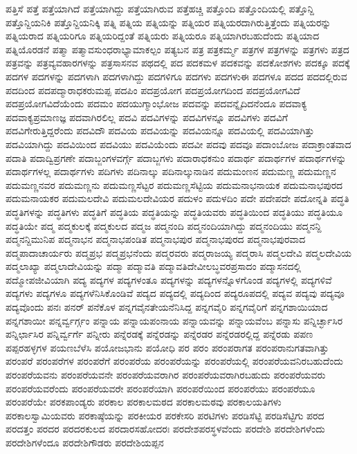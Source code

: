 {ಪತ್ತಿಸೆ
ಪತ್ತೆ
ಪತ್ತೆಯಾಗಿದೆ
ಪತ್ತೆಯಾಗಿದ್ದು
ಪತ್ತೆಯಾಗಿರುವ
ಪತ್ತೆಹಚ್ಚಿ
ಪತ್ತೊಂದಿ
ಪತ್ತೊಂದಿಯಲ್ಲಿ
ಪತ್ತೊನ್ದಿ
ಪತ್ತೊನ್ದಿಯನಿಕಿ
ಪತ್ತೊನ್ದಿಯನಿಕ್ಕಿ
ಪತ್ನಿ
ಪತ್ನಿಯ
ಪತ್ನಿಯನ್ನು
ಪತ್ನಿಯರ
ಪತ್ನಿಯರದಾಗಿರುತ್ತಿತ್ತೆಂದು
ಪತ್ನಿಯರನ್ನು
ಪತ್ನಿಯರಾದ
ಪತ್ನಿಯರಿಗೂ
ಪತ್ನಿಯರಿದ್ದಂತೆ
ಪತ್ನಿಯರು
ಪತ್ನಿಯರೂ
ಪತ್ನಿಯಾಗಿರಬಹುದೆಂದು
ಪತ್ನಿಯಾದ
ಪತ್ನಿಯೊರಡನೆ
ಪತ್ಮಾ
ಪತ್ಮಾವಸುಂಧರಾಭ್ಯಾಮಾಕಲ್ಪಂ
ಪತ್ಯಬನ
ಪತ್ರ
ಪತ್ರಕರ್ಮ್ಮ
ಪತ್ರಗಳ
ಪತ್ರಗಳನ್ನು
ಪತ್ರಗಳು
ಪತ್ರದ
ಪತ್ರವನ್ನು
ಪತ್ರವ್ಯವಹಾರಗಳನ್ನು
ಪತ್ರಸಾಸನವ
ಪಥದಲ್ಲಿ
ಪದ
ಪದಕಮಳ
ಪದಕವನ್ನು
ಪದಕೋಶಗಳು
ಪದಕ್ಕೂ
ಪದಕ್ಕೆ
ಪದಗಳ
ಪದಗಳನ್ನು
ಪದಗಳಾಗಿ
ಪದಗಳಾಗಿದ್ದು
ಪದಗಳಿಗೂ
ಪದಗಳು
ಪದಗಳುಈ
ಪದಗಳೂ
ಪದದ
ಪದದಲ್ಲಿರುವ
ಪದದಿಂದ
ಪದಪದ್ಮಾರಾಧಕರುಮಪ್ಪ
ಪದಪಿಂ
ಪದಪ್ರಯೋಗ
ಪದಪ್ರಯೋಗದಿಂದ
ಪದಪ್ರಯೋಗವಿದೆ
ಪದಪ್ರಯೋಗವಿದೆಯೆಂದು
ಪದಮಂ
ಪದಯುಗ್ಮಾಂಭೋಜ
ಪದವನ್ನು
ಪದವನ್ನೈದಿದನೆಂದೂ
ಪದವಾಕ್ಯ
ಪದವಾಕ್ಯಪ್ರಮಾಣಜ್ಞ
ಪದವಾಗಿರಲಿಲ್ಲ
ಪದವಿ
ಪದವಿಗಳನ್ನು
ಪದವಿಗಳನ್ನೂ
ಪದವಿಗಳು
ಪದವಿಗೆ
ಪದವಿಗೇರುತ್ತಿದ್ದರೆಂದು
ಪದವಿದೌ
ಪದವಿಯ
ಪದವಿಯನ್ನು
ಪದವಿಯನ್ನೂ
ಪದವಿಯಲ್ಲಿ
ಪದವಿಯಾಗಿತ್ತು
ಪದವಿಯಾಗಿದ್ದು
ಪದವಿಯಿಂದ
ಪದವಿಯು
ಪದವಿಯೆಂದು
ಪದವೀ
ಪದವು
ಪದವೂ
ಪದಾಂಬೋಜ
ಪದಾಕ್ರಾಂತವಾದ
ಪದಾತಿ
ಪದಾದ್ವಿಪ್ರಗಣೇ
ಪದಾಬ್ಜಂಗಳವರ್ಗ್ಗೆ
ಪದಾಬ್ಜಗಳು
ಪದಾರಾಧಕನುಂ
ಪದಾರ್ಥ
ಪದಾರ್ಥಗಳ
ಪದಾರ್ಥಗಳನ್ನು
ಪದಾರ್ಥಗಳಲ್ಲ
ಪದಾರ್ಥಗಳು
ಪದಿಗಳು
ಪದಿನಾಲ್ಕು
ಪದಿನಾಲ್ಕುನಾಡಿನ
ಪದುಮಂಣನ
ಪದುಮಣ್ಣ
ಪದುಮಣ್ಣನ
ಪದುಮಣ್ಣನವರ
ಪದುಮಣ್ಣನು
ಪದುಮಣ್ಣಸೆಟ್ಟರ
ಪದುಮಣ್ಣಸೆಟ್ಟಿಯ
ಪದುಮನಾಭನಾಯಕ
ಪದುಮನಾಭಪುರದ
ಪದುಮನಾಯಕರ
ಪದುಮಲದೇವಿ
ಪದುಮಲದೇವಿಯರ
ಪದುಳಂ
ಪದುಳದಿಂ
ಪದೇ
ಪದೇಪದೇ
ಪದೋನ್ನತಿ
ಪದ್ಧತಿ
ಪದ್ಧತಿಗಳನ್ನು
ಪದ್ಧತಿಗಳು
ಪದ್ಧತಿಗೆ
ಪದ್ಧತಿಯ
ಪದ್ಧತಿಯನ್ನು
ಪದ್ಧತಿಯವರು
ಪದ್ಧತಿಯಿಂದ
ಪದ್ಧತಿಯು
ಪದ್ಧತಿಯೂ
ಪದ್ಧತಿಯೇ
ಪದ್ಮ
ಪದ್ಮಕುಲಕ್ಕೆ
ಪದ್ಮಕುಲದ
ಪದ್ಮಜ
ಪದ್ಮನಂದಿ
ಪದ್ಮನಂದಿಯಾಗಿದ್ದು
ಪದ್ಮನಂದಿಯು
ಪದ್ಮನನ್ದಿ
ಪದ್ಮನನ್ದಿಮುನಿಪ
ಪದ್ಮನಾಭನ
ಪದ್ಮನಾಭಪಂಡಿತ
ಪದ್ಮನಾಭಪುರ
ಪದ್ಮನಾಭಪುರದ
ಪದ್ಮನಾಭಪುರವಾದ
ಪದ್ಮಪಾದಾಚಾರ್ಯರು
ಪದ್ಮಪ್ರಭ
ಪದ್ಮಪ್ರಭನೆಂದು
ಪದ್ಮರವರು
ಪದ್ಮರಾಜಯ್ಯ
ಪದ್ಮರಾಸಿ
ಪದ್ಮಲದೇವಿ
ಪದ್ಮಲದೇವಿಯ
ಪದ್ಮಲಾಖ್ಯಾ
ಪದ್ಮಲಾದೇವಿಯನ್ನು
ಪದ್ಮಾ
ಪದ್ಮಾವತಿ
ಪದ್ಮಾವತಿದೇವೀಲಬ್ಧವರಪ್ರಸಾದಂ
ಪದ್ಮಾಸನದಲ್ಲಿ
ಪದ್ಮೋಪಜೀವಿಯಾಗಿ
ಪದ್ಯ
ಪದ್ಯಗಳ
ಪದ್ಯಗಳಂತೂ
ಪದ್ಯಗಳನ್ನು
ಪದ್ಯಗಳನ್ನೊಳಗೊಂಡ
ಪದ್ಯಗಳಲ್ಲಿ
ಪದ್ಯಗಳಿವೆ
ಪದ್ಯಗಳು
ಪದ್ಯಗಳೂ
ಪದ್ಯಗಳೆನಿಸಿಕೊಂಡಿವೆ
ಪದ್ಯದ
ಪದ್ಯದಲ್ಲಿ
ಪದ್ಯದಿಂದ
ಪದ್ಯರೂಪದಲ್ಲಿ
ಪದ್ಯವ
ಪದ್ಯವು
ಪದ್ಯವೂ
ಪದ್ಯವೊಂದು
ಪನಃ
ಪನರ್
ಪನೆಕೊಳ
ಪನ್ನಗವೈನತೇಯನೆನಿಸಿದ್ದ
ಪನ್ನಗವೈರಿ
ಪನ್ನಗವೈರಿಗೆ
ಪನ್ನಗಶಾಯಿಯಾದ
ಪನ್ನಗಶಾಯೀ
ಪನ್ನರ್ವ್ವರ್ಗ್ಗಂ
ಪನ್ನಾಯ
ಪನ್ನಾಯಪಂನಾಯ
ಪನ್ನಾಯವನ್ನು
ಪನ್ನಾಯವೆಂಬ
ಪನ್ನಾಸು
ಪನ್ನಿರ್ಚ್ಛಾಸಿರ
ಪನ್ನಿರ್ಛಾಸಿರ
ಪನ್ನಿರ್ವ್ವರ್ಗೆ
ಪನ್ನೀರು
ಪನ್ನೆರಡಕ್ಕೆ
ಪನ್ನೆರಡನ್ನು
ಪನ್ನೆರಡರ
ಪನ್ನೆರಡರಲ್ಲಿದ್ದ
ಪನ್ನೆರಡು
ಪಪಣ
ಪಪ್ಪರಹಳ್ಳಗಳ
ಪಯಣಬೆಳೆಸಿ
ಪಯೋಜಭಾನು
ಪಯೋಧಿ
ಪರ
ಪರಂ
ಪರಂಪರಾಗತ
ಪರಂಪರಾನುಗತವಾಗಿತ್ತು
ಪರಂಪರೆ
ಪರಂಪರೆಗಳ
ಪರಂಪರೆಗೆ
ಪರಂಪರೆಯ
ಪರಂಪರೆಯನ್ನು
ಪರಂಪರೆಯಲ್ಲಿ
ಪರಂಪರೆಯವನಿರಬಹುದೆಂದು
ಪರಂಪರೆಯವನು
ಪರಂಪರೆಯವನೇ
ಪರಂಪರೆಯವರಾಗಿರ
ಪರಂಪರೆಯವರಾಗಿರಬಹುದು
ಪರಂಪರೆಯವರು
ಪರಂಪರೆಯವರೆಂದು
ಪರಂಪರೆಯವರೇ
ಪರಂಪರೆಯಾಗಿ
ಪರಂಪರೆಯಿಂದ
ಪರಂಪರೆಯು
ಪರಂಪರೆಯೂ
ಪರಂಪರೆಯೇ
ಪರಕಪಾಂಡ್ಯರು
ಪರಕಾಲ
ಪರಕಾಲಮಠದ
ಪರಕಾಲಮಠವು
ಪರಕಾಲಯತಿಗಳು
ಪರಕಾಲಸ್ವಾಮಿಯವರು
ಪರಕಾಷ್ಠೆಯನ್ನು
ಪರಕೀಯರ
ಪರಕೇಸರಿ
ಪರಟಿಗಳು
ಪರಡಿಸೆಟ್ಟಿ
ಪರಡಿಸೆಟ್ಟಿಗು
ಪರದ
ಪರದತ್ತಂ
ಪರದರ
ಪರದರಕುಲದ
ಪರದಾರಸಹೋದರಃ
ಪರದೇಶಪರಸ್ಥಳವೆಂದು
ಪರದೇಶಿ
ಪರದೇಶಿಗಳೆಂದು
ಪರದೇಶಿಗಳೆಂದೂ
ಪರದೇಶಿಗೌಡರು
ಪರದೇಶಿಯಪ್ಪನ
}
